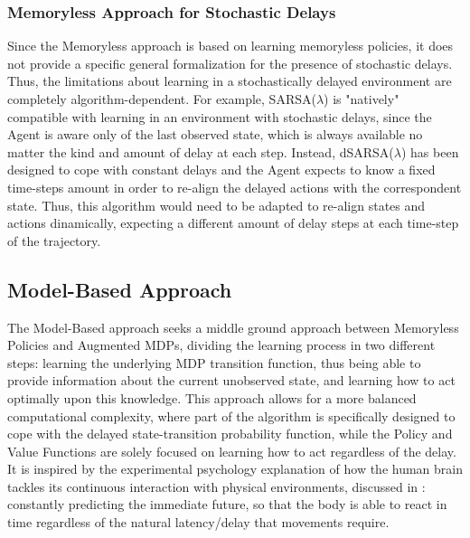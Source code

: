             \subsubsection{Memoryless Approach for Stochastic Delays}
                Since the Memoryless approach is based on learning memoryless policies, it does not provide a specific general formalization for the presence of stochastic delays. Thus, the limitations about learning in a stochastically delayed environment are completely algorithm-dependent. For example, SARSA($\lambda$) is "natively" compatible with learning in an environment with stochastic delays, since the Agent is aware only of the last observed state, which is always available no matter the kind and amount of delay at each step. Instead, dSARSA($\lambda$) has been designed to cope with constant delays and the Agent expects to know a fixed time-steps amount in order to re-align the delayed actions with the correspondent state. Thus, this algorithm would need to be adapted to re-align states and actions dinamically, expecting a different amount of delay steps at each time-step of the trajectory. 
            
        \subsection{Model-Based Approach}
        
        
            \label{subs:modelbasedapproach}
            The Model-Based approach seeks a middle ground approach between Memoryless Policies and Augmented MDPs, dividing the learning process in two different steps: learning the underlying MDP transition function, thus being able to provide information about the current unobserved state, and learning how to act optimally upon this knowledge. This approach allows for a more balanced computational complexity, where part of the algorithm is specifically designed to cope with the delayed state-transition probability function, while the Policy and Value Functions are solely focused on learning how to act regardless of the delay. It is inspired by the experimental psychology explanation of how the human brain tackles its continuous interaction with physical environments, discussed in : constantly predicting the immediate future, so that the body is able to react in time regardless of the natural latency/delay that movements require.
            
